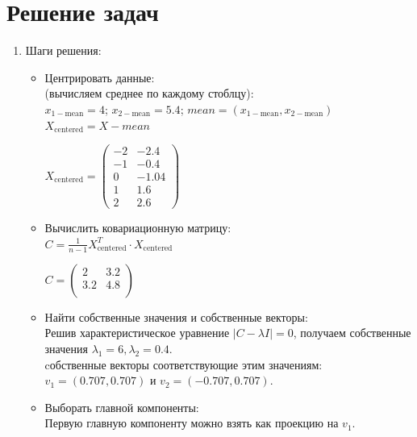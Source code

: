 \section{Решение задач}
\begin{enumerate}
    \item Шаги решения:\\
          \begin{itemize}
              \item Центрировать данные:\\
                    (вычисляем среднее по каждому стоблцу):\\
                    $x_{1-\text{mean}} = 4$;  $x_{2-\text{mean}} = 5.4$;
                    $mean = (x_{1-\text{mean}}, x_{2-\text{mean}})$    \\
                    $X_{\text{centered}} = X - mean$
                    \begin{center}
                        $X_\text{centered} =
                            \begin{pmatrix}
                                -2 & -2.4  \\
                                -1 & -0.4  \\
                                0  & -1.04 \\
                                1  & 1.6   \\
                                2  & 2.6
                            \end{pmatrix}$\par
                    \end{center}
              \item Вычислить ковариационную матрицу: \\
                    $ C = \frac{1}{n-1} X_\text{centered}^T \cdot X_\text{centered}$
                    \begin{center}
                        $C =
                            \begin{pmatrix}
                                2   & 3.2 \\
                                3.2 & 4.8 \\
                            \end{pmatrix}$\par
                    \end{center}

              \item Найти собственные значения и собственные векторы: \\
                    Решив характеристическое уравнение $ |C - \lambda I| = 0 $, получаем собственные значения $\lambda_1 = 6, \lambda_2 = 0.4$.\\
                    cобственные векторы соответствующие этим значениям:  \\
                    $v_1 = (0.707, 0.707)$  и  $v_2 = (-0.707, 0.707)$.
              \item Выборать главной компоненты: \\
                    Первую главную компоненту можно взять как проекцию на  $v_1$.
          \end{itemize}


\end{enumerate}

